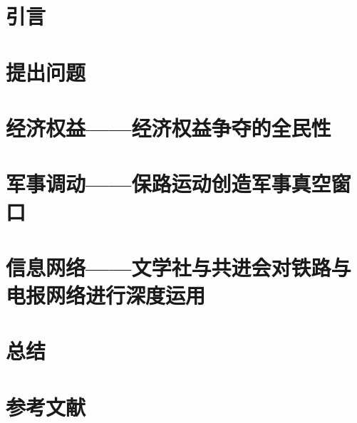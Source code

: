 \documentclass{source/Paper}
\begin{document}
\makeheader
\setcounter{section}{-1}
\section{引言}

\section{提出问题}

\section{经济权益——经济权益争夺的全民性}

\section{军事调动——保路运动创造军事真空窗口}

\section{信息网络——文学社与共进会对铁路与电报网络进行深度运用}

\section{总结}

\section{参考文献}
\printbibliography[heading=bibliography, title=参考文献]
\end{document}
